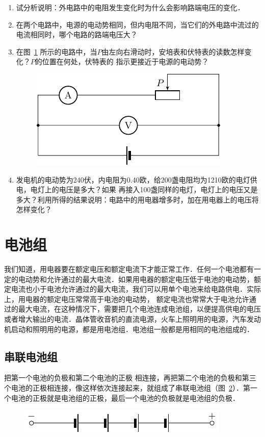 \begin{enumerate}
    \item 试分析说明：外电路中的电阻发生变化时为什么会影响路端电压的变化．
    \item 在两个电路中，电源的电动势相同，但内电阻不同，当它们的外电路中流过的电流相同时，哪个电路的路端电压大？
    \item 在图~\ref{fig_B_7-32} 所示的电路中，当$P$由左向右滑动时，安培表和伏特表的读数怎样变化？$P$的位置在何处，伏特表的
指示更接近于电源的电动势？

\begin{figure}[htbp]
    \centering
    \includegraphics{fig/B/7-32.pdf}
    \caption{}\label{fig_B_7-32}
\end{figure}

\item 发电机的电动势为240伏，内电阻为0.40欧，给200盏电阻均为1210欧的电灯供电，电灯上的电压是多大？如果
再接入100盏同样的电灯，电灯上的电压又是多大？利用所得的结果说明：电路中的用电器增多时，加在用电器上的电压将
怎样变化？
\end{enumerate}


\section{电池组}
我们知道，用电器要在额定电压和额定电流下才能正常工作．任何一个电池都有一定的电动势和允许通过的最大电流．如果用电器的额定电压低于电池的电动势，额定电流也小于电池允许通过的最大电流，我们可以用单个电池来给电路供电．实际上，用电器的额定电压常常高于电池的电动势，
额定电流也常常大于电池允许通过的最大电流，在这种情况下，需要把几个电池连成电池组，以便提高供电的电压或者增大输出的电流．晶体管收音机的直流电源，火车上照明用的电源，汽车发动机启动和照明用的电源，都是用电池组．电池组一般都是用相同的电池组成的．

\subsection{串联电池组}

把第一个电池的负极和第二个电池的正极
相连接，再把第二个电池的负极和第三个电池的正极相连接，像这样依次连接起来，就组成了串联电池组（图~\ref{fig_B_7-33}）．第一个电池的正极就是电池组的正极，最后一个电池的负极就是电池组的负极．
\begin{figure}[htbp]
    \centering
    \includegraphics{fig/B/7-33.pdf}
    \caption{}\label{fig_B_7-33}
\end{figure}

